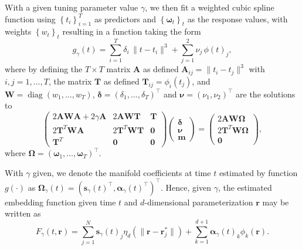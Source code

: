 \documentclass[11pt,reqno]{article}
\newcommand{\T}{\intercal}
\theoremstyle{definition}
\begin{document}
With a given tuning parameter value $\gamma$, we then fit a weighted cubic spline function using $\left\{t_i\right\}_{i=1}^T$ as predictors and $\left\{\mathbf{\omega}_t\right\}_t$ as the response values, with weights $\left\{w_t\right\}_t$ resulting in a function taking the form
\begin{equation}\nonumber
  g_{\gamma}(t) = \sum_{i=1}^{T}\delta_i \,\|t - t_i\|^{3} + \sum_{j=1}^{2}\nu_j\,\phi(t)_j,
\end{equation}
where by defining the $T \times T$ matrix $\boldsymbol{A}$ as defined  $\boldsymbol{A}_{ij} = \|t_i - t_j\|^{3}$ with $i,j = 1,\ldots, T$, the matrix $\boldsymbol{T}$ as defined $\boldsymbol{T}_{ij} = \phi_i(t_j)$, and $\boldsymbol{W} = \operatorname{diag}(w_1, \dots, w_T)$,  $\boldsymbol{\delta}=(\delta_1,\ldots,\delta_T)^\T$ and $\boldsymbol{\nu}=(\nu_1,\nu_2)^\T$ are the solutions to
\begin{equation}
  \left(
  \begin{array}{ccc}
    2\boldsymbol{A}\boldsymbol{W}\boldsymbol{A} + 2\gamma\boldsymbol{A} & 2\boldsymbol{A}\boldsymbol{W}\boldsymbol{T} & \boldsymbol{T} \\
    2\boldsymbol{T}^{T}\boldsymbol{W}\boldsymbol{A} & 2\boldsymbol{T}^{T}\boldsymbol{W}\boldsymbol{T} & \boldsymbol{0} \\
    \boldsymbol{T}^{T} & \boldsymbol{0} & \boldsymbol{0}
  \end{array}
  \right)\left(
  \begin{array}{c}
    \boldsymbol{\delta} \\
    \boldsymbol{\nu} \\
    \boldsymbol{m}
  \end{array}
  \right) = \left(
  \begin{array}{c}
    2\boldsymbol{A}\boldsymbol{W}\boldsymbol{\Omega} \\
    2\boldsymbol{T}^{T}\boldsymbol{W}\boldsymbol{\Omega} \\
    \boldsymbol{0}
  \end{array}
  \right), \label{eq:16}
\end{equation}
where $\boldsymbol{\Omega}=(\boldsymbol{\omega}_1,\ldots, \boldsymbol{\omega}_T)^\T$.

With $\gamma$ given, we denote the manifold coefficients at time $t$ estimated by function $g(\cdot)$ as $\boldsymbol{\Omega}_{\gamma}(t) = \left(\boldsymbol{s}_{\gamma}(t)^\T, \boldsymbol{\alpha}_{\gamma}(t)^\T\right)^\T$. Hence, given $\gamma$, the estimated embedding function given time $t$ and $d$-dimensional parameterization $\boldsymbol{r}$ may be written as
\begin{equation}
  F_{\gamma}(t, \boldsymbol{r}) = \sum_{j=1}^{N}\boldsymbol{s}_{\gamma}(t)_j \eta_{d}\left(\|\boldsymbol{r} - \boldsymbol{r}_j^*\|\right) + \sum_{k=1}^{d+1}\boldsymbol{\alpha}_{\gamma}(t)_k \phi_k(\boldsymbol{r}). \label{eq:17}
\end{equation}
\end{document}
